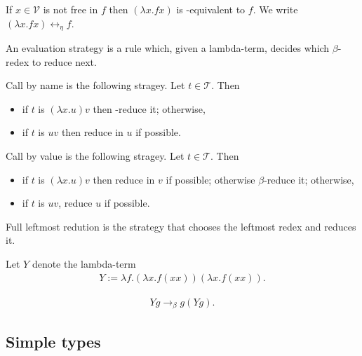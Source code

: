 \documentclass{article}
\begin{document}
\begin{definition*}
	If $x\in\mathcal{V}$ is not free in $f$ then $(\lambda x. f x)$ is \eta-equivalent to $f$. We write 
	$(\lambda x. f x)\leftrightarrow_\eta f$.	
\end{definition*}

\begin{definition*}[Evaluation]
	An evaluation strategy is a rule which, given a lambda-term, decides which $\beta$-redex to reduce 
	next. 

	Call by name is the following stragey. Let $t\in\mathcal{T}$. Then 
	\begin{itemize}
		\item if $t$ is $(\lambda x. u) v$ then \beta-reduce it; otherwise,
		\item if $t$ is $uv$ then reduce in $u$ if possible.
	\end{itemize}
	Call by value is the following stragey. Let $t\in\mathcal{T}$. Then 
	\begin{itemize}
		\item if $t$ is $(\lambda x. u) v$ then reduce in $v$ if possible; otherwise $\beta$-reduce it; otherwise,
		\item if $t$ is $uv$, reduce $u$ if possible.
	\end{itemize}
	Full leftmost redution is the strategy that chooses the leftmost redex and reduces it.
\end{definition*}

\begin{definition*}[Y-combinator]
	Let $Y$ denote the lambda-term 
	\begin{align*}
		Y := \lambda f. (\lambda x. f (x x)) (\lambda x. f (x x)).
	\end{align*}	
\end{definition*}

\begin{lemma*}
	\begin{align*}
		Y g \to_\beta g (Y g).
	\end{align*}
\end{lemma*}

\subsection{Simple types}
\end{document}
